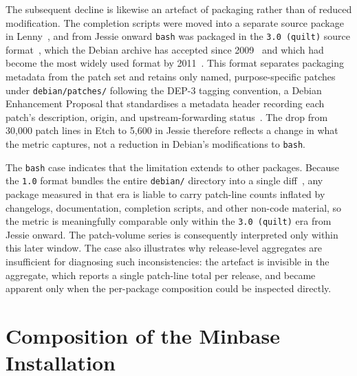 The subsequent decline is likewise an artefact of packaging rather than of reduced modification. The completion scripts were moved into a separate source package in Lenny~\cite{bashChangelog}, and from Jessie onward \texttt{bash} was packaged in the \texttt{3.0 (quilt)} source format~\cite{debsrc3quilt}, which the Debian archive has accepted since 2009~\cite{ddaNewFormats2009} and which had become the most widely used format by 2011~\cite{hertzog2011quilt}. This format separates packaging metadata from the patch set and retains only named, purpose-specific patches under \texttt{debian/patches/} following the DEP-3 tagging convention, a Debian Enhancement Proposal that standardises a metadata header recording each patch's description, origin, and upstream-forwarding status~\cite{dep3}. The drop from 30{,}000 patch lines in Etch to 5{,}600 in Jessie therefore reflects a change in what the metric captures, not a reduction in Debian's modifications to \texttt{bash}.

The \texttt{bash} case indicates that the limitation extends to other packages. Because the \texttt{1.0} format bundles the entire \texttt{debian/} directory into a single diff~\cite{debsrc3quilt}, any package measured in that era is liable to carry patch-line counts inflated by changelogs, documentation, completion scripts, and other non-code material, so the metric is meaningfully comparable only within the \texttt{3.0 (quilt)} era from Jessie onward. The patch-volume series is consequently interpreted only within this later window. The case also illustrates why release-level aggregates are insufficient for diagnosing such inconsistencies: the artefact is invisible in the aggregate, which reports a single patch-line total per release, and became apparent only when the per-package composition could be inspected directly.

\section{Composition of the Minbase Installation}
\label{sec:composition}

